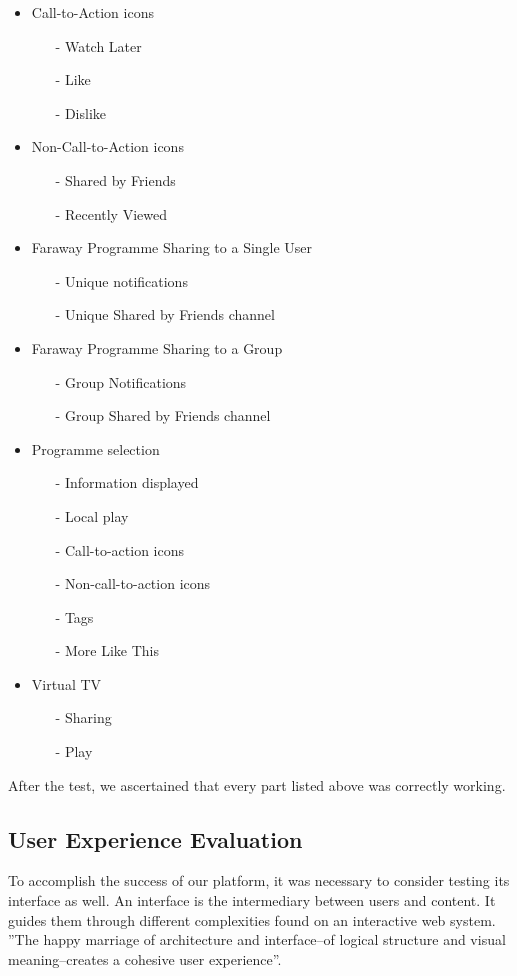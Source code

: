 \documentclass{acm_proc_article-sp}
\begin{document}
\begin{itemize}
\begin{itemize}
  \end{itemize}
  \item Call-to-Action icons
  \begin{itemize}
  	\item [-]Watch Later
  	\item [-]Like
  	\item [-]Dislike
  \end{itemize}
  \item Non-Call-to-Action icons
  \begin{itemize}
  	\item [-]Shared by Friends
  	\item [-]Recently Viewed
  \end{itemize}
  \item Faraway Programme Sharing to a Single User
  \begin{itemize}
  	\item [-]Unique notifications
  	\item [-]Unique Shared by Friends channel
  \end{itemize}
  \item Faraway Programme Sharing to a Group
  \begin{itemize}
  	\item [-]Group Notifications
  	\item [-]Group Shared by Friends channel
  \end{itemize}
  \item Programme selection
  \begin{itemize}
  	\item [-]Information displayed
  	\item [-]Local play
  	\item [-]Call-to-action icons
  	\item [-]Non-call-to-action icons
  	\item [-]Tags
  	\item [-]More Like This
  \end{itemize}
  \item Virtual TV
  \begin{itemize}
  	\item [-]Sharing
  	\item [-]Play
  \end{itemize}
\end{itemize}

After the test, we ascertained that every part listed above was correctly working. 
\subsection{User Experience Evaluation}
To accomplish the success of our platform, it was necessary to consider testing its interface as 
well. An interface is the intermediary between users and content. It guides them through different complexities found on an interactive web system. ''The happy marriage of architecture and interface--of logical structure and visual meaning--creates a cohesive user experience''\cite{fleming1998web}. 
\end{document}
